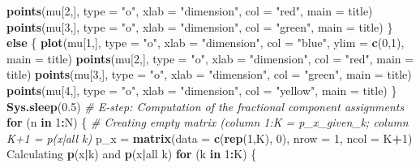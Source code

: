 \documentclass[]{article}
\newenvironment{Shaded}{\begin{snugshade}}{\end{snugshade}}
\newcommand{\KeywordTok}[1]{\textcolor[rgb]{0.13,0.29,0.53}{\textbf{#1}}}
\newcommand{\DataTypeTok}[1]{\textcolor[rgb]{0.13,0.29,0.53}{#1}}
\newcommand{\DecValTok}[1]{\textcolor[rgb]{0.00,0.00,0.81}{#1}}
\newcommand{\FloatTok}[1]{\textcolor[rgb]{0.00,0.00,0.81}{#1}}
\newcommand{\StringTok}[1]{\textcolor[rgb]{0.31,0.60,0.02}{#1}}
\newcommand{\CommentTok}[1]{\textcolor[rgb]{0.56,0.35,0.01}{\textit{#1}}}
\newcommand{\ControlFlowTok}[1]{\textcolor[rgb]{0.13,0.29,0.53}{\textbf{#1}}}
\newcommand{\OperatorTok}[1]{\textcolor[rgb]{0.81,0.36,0.00}{\textbf{#1}}}
\newcommand{\NormalTok}[1]{#1}
\begin{document}
\begin{Shaded}
\begin{Highlighting}[]
\KeywordTok{points}\NormalTok{(mu[}\DecValTok{2}\NormalTok{,], }\DataTypeTok{type =} \StringTok{"o"}\NormalTok{, }\DataTypeTok{xlab =} \StringTok{"dimension"}\NormalTok{, }\DataTypeTok{col =} \StringTok{"red"}\NormalTok{, }\DataTypeTok{main =}\NormalTok{ title)}
\KeywordTok{points}\NormalTok{(mu[}\DecValTok{3}\NormalTok{,], }\DataTypeTok{type =} \StringTok{"o"}\NormalTok{, }\DataTypeTok{xlab =} \StringTok{"dimension"}\NormalTok{, }\DataTypeTok{col =} \StringTok{"green"}\NormalTok{, }\DataTypeTok{main =}\NormalTok{ title)}
\NormalTok{\} }\ControlFlowTok{else}\NormalTok{ \{}
\KeywordTok{plot}\NormalTok{(mu[}\DecValTok{1}\NormalTok{,], }\DataTypeTok{type =} \StringTok{"o"}\NormalTok{, }\DataTypeTok{xlab =} \StringTok{"dimension"}\NormalTok{, }\DataTypeTok{col =} \StringTok{"blue"}\NormalTok{, }\DataTypeTok{ylim =} \KeywordTok{c}\NormalTok{(}\DecValTok{0}\NormalTok{,}\DecValTok{1}\NormalTok{), }\DataTypeTok{main =}\NormalTok{ title)}
\KeywordTok{points}\NormalTok{(mu[}\DecValTok{2}\NormalTok{,], }\DataTypeTok{type =} \StringTok{"o"}\NormalTok{, }\DataTypeTok{xlab =} \StringTok{"dimension"}\NormalTok{, }\DataTypeTok{col =} \StringTok{"red"}\NormalTok{, }\DataTypeTok{main =}\NormalTok{ title)}
\KeywordTok{points}\NormalTok{(mu[}\DecValTok{3}\NormalTok{,], }\DataTypeTok{type =} \StringTok{"o"}\NormalTok{, }\DataTypeTok{xlab =} \StringTok{"dimension"}\NormalTok{, }\DataTypeTok{col =} \StringTok{"green"}\NormalTok{, }\DataTypeTok{main =}\NormalTok{ title)}
\KeywordTok{points}\NormalTok{(mu[}\DecValTok{4}\NormalTok{,], }\DataTypeTok{type =} \StringTok{"o"}\NormalTok{, }\DataTypeTok{xlab =} \StringTok{"dimension"}\NormalTok{, }\DataTypeTok{col =} \StringTok{"yellow"}\NormalTok{, }\DataTypeTok{main =}\NormalTok{ title)}
\NormalTok{\}}
\KeywordTok{Sys.sleep}\NormalTok{(}\FloatTok{0.5}\NormalTok{)}
\CommentTok{# E-step: Computation of the fractional component assignments}
\ControlFlowTok{for}\NormalTok{ (n }\ControlFlowTok{in} \DecValTok{1}\OperatorTok{:}\NormalTok{N) \{}
\CommentTok{# Creating empty matrix (column 1:K = p_x_given_k; column K+1 = p(x|all k)}
\NormalTok{p_x =}\StringTok{ }\KeywordTok{matrix}\NormalTok{(}\DataTypeTok{data =} \KeywordTok{c}\NormalTok{(}\KeywordTok{rep}\NormalTok{(}\DecValTok{1}\NormalTok{,K), }\DecValTok{0}\NormalTok{), }\DataTypeTok{nrow =} \DecValTok{1}\NormalTok{, }\DataTypeTok{ncol =}\NormalTok{ K}\OperatorTok{+}\DecValTok{1}\NormalTok{)}
\NormalTok{Calculating }\KeywordTok{p}\NormalTok{(x}\OperatorTok{|}\NormalTok{k) and }\KeywordTok{p}\NormalTok{(x}\OperatorTok{|}\NormalTok{all k)}
\ControlFlowTok{for}\NormalTok{ (k }\ControlFlowTok{in} \DecValTok{1}\OperatorTok{:}\NormalTok{K) \{}

\end{Highlighting}
\end{Shaded}
\end{document}
